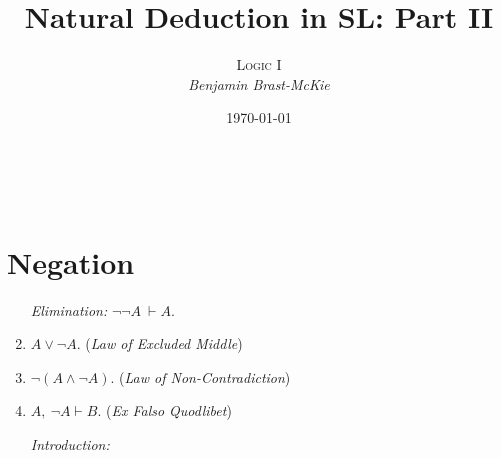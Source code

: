 \documentclass[a4paper, 11pt]{article} %
\title{\textbf{Natural Deduction in SL: Part II}} %
\author{\textsc{Logic I}\\ \em Benjamin Brast-McKie} %
\date{\today} %
\makeatletter
\renewcommand{\maketitle}{ %
\begin{flushright} %
{\LARGE\@title} %

\vspace{10pt} %

{\@author} %
\\\@date %

\vspace{-10pt} %
\end{flushright}
}
\makeatother
\begin{document}
\maketitle %

\thispagestyle{empty}



\section*{Negation}

\begin{enumerate}
  \item[\it Elimination:] $\neg\neg A\ \vdash A$. 
  \item $A \vee \neg A$. \quad(\textit{Law of Excluded Middle})
  \item $\neg(A \wedge \neg A)$. \quad(\textit{Law of Non-Contradiction})
  \item $A,\ \neg A \vdash B$. \quad(\textit{Ex Falso Quodlibet})
  \item[\it Introduction:]
\end{enumerate}

\end{document}
